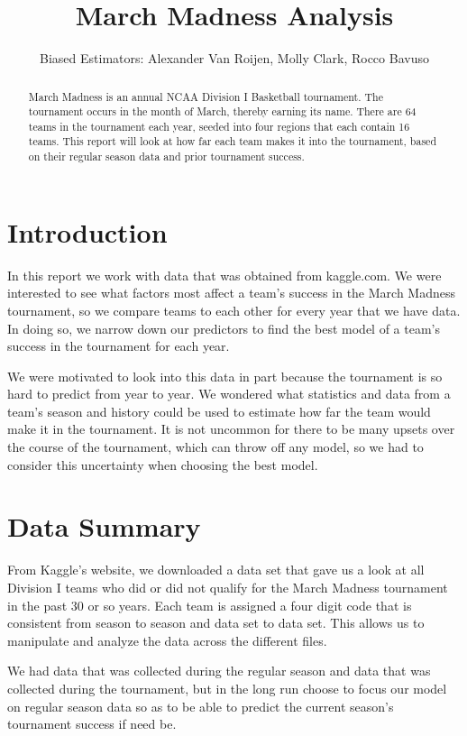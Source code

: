 \documentclass[]{scrartcl}
\title{March Madness Analysis}
\author{Biased Estimators: Alexander Van Roijen, Molly Clark, Rocco Bavuso}
\begin{document}
\maketitle

\begin{abstract}
\begin{center}
	\noindent March Madness is an annual NCAA Division I Basketball tournament. The tournament occurs in the month of March, thereby earning its name. There are 64 teams in the tournament each year, seeded into four regions that each contain 16 teams. This report will look at how far each team makes it into the tournament, based on their regular season data and prior tournament success.
\end{center}
\end{abstract}

\section*{Introduction}
\noindent In this report we work with data that was obtained from kaggle.com. We were interested to see what factors most affect a team's success in the March Madness tournament, so we compare teams to each other for every year that we have data. In doing so, we narrow down our predictors to find the best model of a team's success in the tournament for each year.

\noindent We were motivated to look into this data in part because the tournament is so hard to predict from year to year. We wondered what statistics and data from a team's season and history could be used to estimate how far the team would make it in the tournament. It is not uncommon for there to be many upsets over the course of the tournament, which can throw off any model, so we had to consider this uncertainty when choosing the best model.
\section*{Data Summary}
From Kaggle's website, we downloaded a data set that gave us a look at all Division I teams who did or did not qualify for the March Madness tournament in the past 30 or so years. Each team is assigned a four digit code that is consistent from season to season and data set to data set. This allows us to manipulate and analyze the data across the different files.

We had data that was collected during the regular season and data that was collected during the tournament, but in the long run choose to focus our model on regular season data so as to be able to predict the current season's tournament success if need be.
\end{document}
